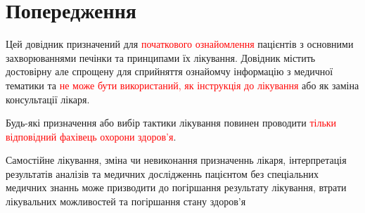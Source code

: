 \chapter*{Попередження}

Цей довідник призначений для \textcolor{red}{початкового ознайомлення}   пацієнтів з основними захворюваннями печінки та принципами їх лікування. Довідник містить достовірну але спрощену для сприйняття ознайомчу інформацію з медичної тематики та \textcolor{red}{не може бути використаний, як інструкція до лікування} або як заміна консультації лікаря.

Будь-які призначення або вибір тактики лікування  повинен проводити \textcolor{red}{тільки відповідний фахівець охорони здоров'я}. 

Самостійне лікування, зміна чи невиконання призначеннь лікаря,  інтерпретація результатів  аналізів та медичних дослідженнь пацієнтом без спеціальних медичних знаннь може призводити до погіршання результату лікування, втрати лікувальних можливостей та погіршання стану здоров'я  
